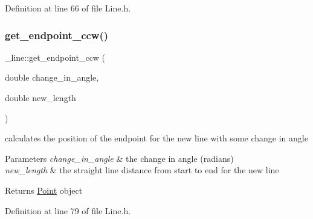 Definition at line 66 of file Line.\+h.


\begin{DoxyCode}{0}

\end{DoxyCode}
\mbox{\label{struct__line_a80acbbf95632aa4a0b976f417e95951e}} 
\subsubsection{\texorpdfstring{get\_endpoint\_ccw()}{get\_endpoint\_ccw()}}
{\footnotesize\ttfamily \+\_\+line\+::get\+\_\+endpoint\+\_\+ccw (\begin{DoxyParamCaption}\item[{double}]{change\+\_\+in\+\_\+angle,  }\item[{double}]{new\+\_\+length }\end{DoxyParamCaption})\hspace{0.3cm}{\ttfamily [inline]}}



calculates the position of the endpoint for the new line with some change in angle 


\begin{DoxyParams}{Parameters}
{\em change\+\_\+in\+\_\+angle} & the change in angle (radians) \\
\hline
{\em new\+\_\+length} & the straight line distance from start to end for the new line \\
\hline
\end{DoxyParams}
\begin{DoxyReturn}{Returns}
\mbox{\hyperlink{struct_point}{Point}} object 
\end{DoxyReturn}


Definition at line 79 of file Line.\+h.


